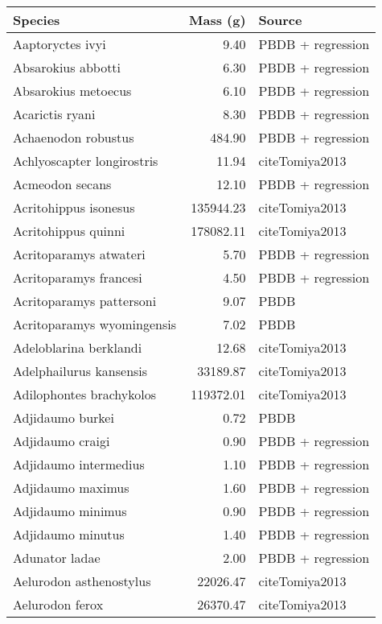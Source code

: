 \begin{table}[ht]
\centering
\begin{tabular}{lrl}
  \hline
Species & Mass (g) & Source \\ 
  \hline
Aaptoryctes ivyi & 9.40 & PBDB + regression \\ 
  Absarokius abbotti & 6.30 & PBDB + regression \\ 
  Absarokius metoecus & 6.10 & PBDB + regression \\ 
  Acarictis ryani & 8.30 & PBDB + regression \\ 
  Achaenodon robustus & 484.90 & PBDB + regression \\ 
  Achlyoscapter longirostris & 11.94 & cite{Tomiya2013} \\ 
  Acmeodon secans & 12.10 & PBDB + regression \\ 
  Acritohippus isonesus & 135944.23 & cite{Tomiya2013} \\ 
  Acritohippus quinni & 178082.11 & cite{Tomiya2013} \\ 
  Acritoparamys atwateri & 5.70 & PBDB + regression \\ 
  Acritoparamys francesi & 4.50 & PBDB + regression \\ 
  Acritoparamys pattersoni & 9.07 & PBDB \\ 
  Acritoparamys wyomingensis & 7.02 & PBDB \\ 
  Adeloblarina berklandi & 12.68 & cite{Tomiya2013} \\ 
  Adelphailurus kansensis & 33189.87 & cite{Tomiya2013} \\ 
  Adilophontes brachykolos & 119372.01 & cite{Tomiya2013} \\ 
  Adjidaumo burkei & 0.72 & PBDB \\ 
  Adjidaumo craigi & 0.90 & PBDB + regression \\ 
  Adjidaumo intermedius & 1.10 & PBDB + regression \\ 
  Adjidaumo maximus & 1.60 & PBDB + regression \\ 
  Adjidaumo minimus & 0.90 & PBDB + regression \\ 
  Adjidaumo minutus & 1.40 & PBDB + regression \\ 
  Adunator ladae & 2.00 & PBDB + regression \\ 
  Aelurodon asthenostylus & 22026.47 & cite{Tomiya2013} \\ 
  Aelurodon ferox & 26370.47 & cite{Tomiya2013} \\ 

\end{tabular}
\end{table}
